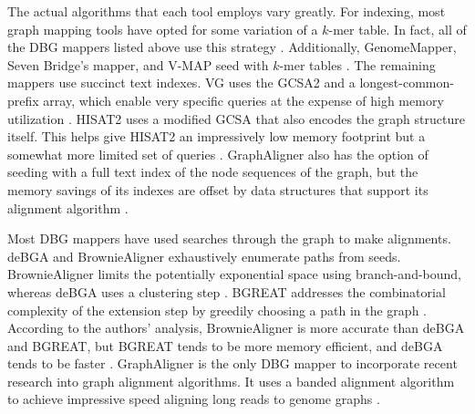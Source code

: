 The actual algorithms that each tool employs vary greatly. 
For indexing, most graph mapping tools have opted for some variation of a $k$-mer table. 
In fact, all of the DBG mappers listed above use this strategy \cite{Holley_2012, Limasset_2016, Liu_2016, Heydari_2018, Rautiainen_2019b}. 
Additionally, GenomeMapper, Seven Bridge's mapper, and V-MAP seed with $k$-mer tables \cite{Schneeberger_2009, Rakocevic_2019, Vaddadi_2019}. 
The remaining mappers use succinct text indexes.
VG uses the GCSA2 \cite{Siren_2017} and a longest-common-prefix array, which enable very specific queries at the expense of high memory utilization \cite{Garrison_2019}.
HISAT2 uses a modified GCSA \cite{Siren_2014} that also encodes the graph structure itself.
This helps give HISAT2 an impressively low memory footprint but a somewhat more limited set of queries \cite{Kim_2019}.
GraphAligner also has the option of seeding with a full text index of the node sequences of the graph, but the memory savings of its indexes are offset by data structures that support its alignment algorithm \cite{Rautiainen_2019b}.

Most DBG mappers have used searches through the graph to make alignments.
deBGA and BrownieAligner exhaustively enumerate paths from seeds. 
BrownieAligner limits the potentially exponential space using branch-and-bound, whereas deBGA uses a clustering step \cite{Liu_2016, Heydari_2018}.
BGREAT addresses the combinatorial complexity of the extension step by greedily choosing a path in the graph \cite{Limasset_2016}.
According to the authors' analysis, BrownieAligner is more accurate than deBGA and BGREAT, but BGREAT tends to be more memory efficient, and deBGA tends to be faster \cite{Heydari_2018}.
GraphAligner is the only DBG mapper to incorporate recent research into graph alignment algorithms.
It uses a banded alignment algorithm to achieve impressive speed aligning long reads to genome graphs \cite{Rautiainen_2019b}.

